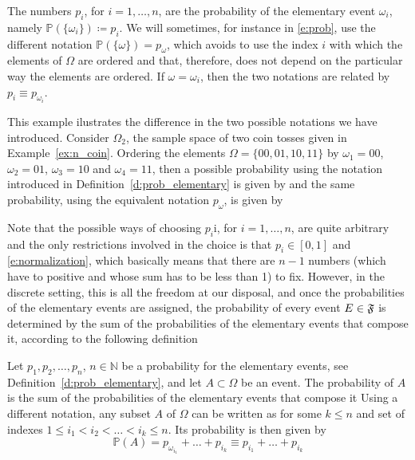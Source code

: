 	  The numbers $p_i$, for $i = 1,\ldots, n$, are the probability of the elementary event $\omega_i$, namely $\mathbb P(\{\omega_i\}) \coloneq p_i$. We will sometimes, for instance in \eqref{e:prob}, use the different notation $\mathbb P(\{\omega\}) = p_\omega$, which avoids to use the index $i$ with which the elements of $\Omega$ are ordered and that, therefore, does not depend on the particular way the elements are ordered. If $\omega = \omega_i$, then the two notations are related by $p_i \equiv p_{\omega_i}$. 
	  \begin{example}
		  \label{ex:coin_toss_notation}
		  This example ilustrates the difference in the two possible notations we have introduced. Consider $\Omega_2$, the sample space of two coin tosses given in Example~\ref{ex:n_coin}. Ordering the elements $\Omega = \{00,01,10,11\}$  by $\omega_1 = 00$, $\omega_2 = 01$, $\omega_3= 10$ and $\omega_4 =11$, then a possible probability using the notation introduced in Definition~\ref{d:prob_elementary} is given by 
		  and the same probability, using the equivalent notation $p_\omega$, is given by 
	\end{example}
	Note that the possible ways of choosing $p_i$i, for $i = 1,\ldots, n$, are quite arbitrary and the only restrictions involved in the choice is that $p_i \in [0,1]$ and \eqref{e:normalization}, which basically means that there are $n-1$ numbers (which have to positive and whose sum has to be less than 1) to fix. However, in the discrete setting, this is all the freedom at our disposal, and once the probabilities of the elementary events are assigned, the probability of every event $E \in {\mathfrak F}$  is determined by the sum of the probabilities of the elementary events that compose it, according to the following definition   
   \begin{definition}
        \label{d:prob}
        Let $p_1, p_2, \ldots, p_n$, $n \in \mathbb N$ be a probability for the elementary events, see Definition~\ref{d:prob_elementary}, and let $A \subset \Omega$ be an event. The probability of $A$ is the sum of the probabilities of the elementary events that compose it 
	Using a different notation, any subset $A$ of $\Omega$ can be written as 
		for some $k \leq n$ and set of indexes $1\leq i_1 < i_2 < \ldots < i_k \leq n$. Its probability is then given by 
	    	\begin{equation}
		\label{e:prob2}
			\mathbb P(A) = p_{\omega_{i_1}} + \ldots + p_{i_k} \equiv p_{i_1} + \ldots + p_{i_k}
            \end{equation}
            \end{definition}
